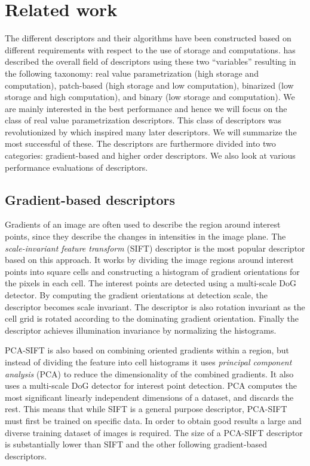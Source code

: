 \documentclass[thesis.tex]{subfiles}
\begin{document}
\section{Related work}
The different descriptors and their algorithms have been constructed based on different requirements with respect to the use of storage and computations. \cite{heinly2012comparative} has described the overall field of descriptors using these two ``variables'' resulting in the following taxonomy: real value parametrization (high storage and computation), patch-based (high storage and low computation), binarized (low storage and high computation), and binary (low storage and computation). We are mainly interested in the best performance and hence we will focus on the class of real value parametrization descriptors. This class of descriptors was revolutionized by \cite{lowe2004distinctive} which inspired many later descriptors. We will summarize the most successful of these. The descriptors are furthermore divided into two categories: gradient-based and higher order descriptors. We also look at various performance evaluations of descriptors.

\subsection{Gradient-based descriptors}
Gradients of an image are often used to describe the region around interest points, since they describe the changes in intensities in the image plane. The \emph{scale-invariant feature transform} (SIFT) descriptor \cite{lowe2004distinctive} is the most popular descriptor based on this approach. It works by dividing the image regions around interest points into square cells and constructing a histogram of gradient orientations for the pixels in each cell. The interest points are detected using a multi-scale DoG detector. By computing the gradient orientations at detection scale, the descriptor becomes scale invariant. The descriptor is also rotation invariant as the cell grid is rotated according to the dominating gradient orientation. Finally the descriptor achieves illumination invariance by normalizing the histograms.

PCA-SIFT \cite{ke2004pca} is also based on combining oriented gradients within a region, but instead of dividing the feature into cell histograms it uses \emph{principal component analysis} (PCA) to reduce the dimensionality of the combined gradients. It also uses a multi-scale DoG detector for interest point detection. PCA computes the most significant linearly independent dimensions of a dataset, and discards the rest. This means that while SIFT is a general purpose descriptor, PCA-SIFT must first be trained on specific data. In order to obtain good results a large and diverse training dataset of images is required. The size of a PCA-SIFT descriptor is substantially lower than SIFT and the other following gradient-based descriptors.
\end{document}
